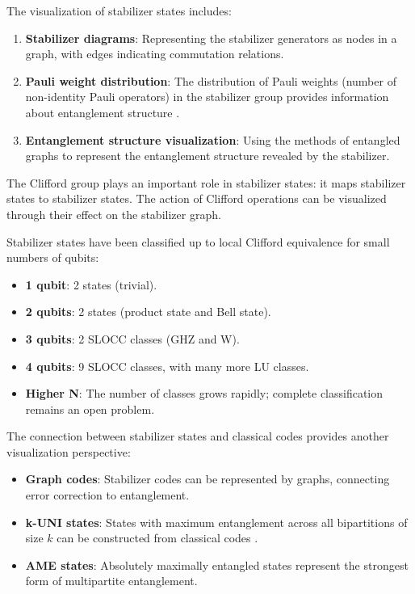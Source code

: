 \documentclass[12pt,a4paper]{article}
\begin{document}
The visualization of stabilizer states includes:
\begin{enumerate}
	\item \textbf{Stabilizer diagrams}: Representing the stabilizer generators as nodes in a graph, with edges indicating commutation relations.
	\item \textbf{Pauli weight distribution}: The distribution of Pauli weights (number of non-identity Pauli operators) in the stabilizer group provides information about entanglement structure \cite{GraphStateVis}.
	\item \textbf{Entanglement structure visualization}: Using the methods of entangled graphs to represent the entanglement structure revealed by the stabilizer.
\end{enumerate}

The Clifford group plays an important role in stabilizer states: it maps stabilizer states to stabilizer states. The action of Clifford operations can be visualized through their effect on the stabilizer graph.

Stabilizer states have been classified up to local Clifford equivalence for small numbers of qubits:
\begin{itemize}
	\item \textbf{1 qubit}: 2 states (trivial).
	\item \textbf{2 qubits}: 2 states (product state and Bell state).
	\item \textbf{3 qubits}: 2 SLOCC classes (GHZ and W).
	\item \textbf{4 qubits}: 9 SLOCC classes, with many more LU classes.
	\item \textbf{Higher N}: The number of classes grows rapidly; complete classification remains an open problem.
\end{itemize}

The connection between stabilizer states and classical codes provides another visualization perspective:
\begin{itemize}
	\item \textbf{Graph codes}: Stabilizer codes can be represented by graphs, connecting error correction to entanglement.
	\item \textbf{k-UNI states}: States with maximum entanglement across all bipartitions of size $k$ can be constructed from classical codes \cite{Raissi2021}.
	\item \textbf{AME states}: Absolutely maximally entangled states represent the strongest form of multipartite entanglement.
\end{itemize}
\end{document}
